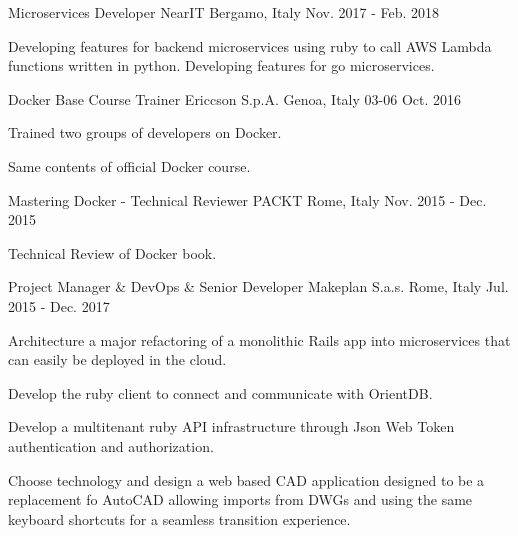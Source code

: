 \begin{cventries}
  \cventry
    {Microservices Developer} %
    {NearIT} %
    {Bergamo, Italy} %
    {Nov. 2017 - Feb. 2018} %
    {
      \begin{cvitems} %
        \item {Developing features for backend microservices using ruby to call AWS Lambda functions written in python. Developing features for go microservices.}
      \end{cvitems}
    }

  \cventry
    {Docker Base Course Trainer} %
    {Ericcson S.p.A.} %
    {Genoa, Italy} %
    {03-06 Oct. 2016} %
    {
      \begin{cvitems} %
        \item {Trained two groups of developers on Docker.}
        \item {Same contents of official Docker course.}
      \end{cvitems}
    }

  \cventry
    {Mastering Docker - Technical Reviewer} %
    {PACKT} %
    {Rome, Italy} %
    {Nov. 2015 - Dec. 2015} %
    {
      \begin{cvitems} %
        \item {Technical Review of Docker book.}
      \end{cvitems}
    }

  \cventry
    {Project Manager \& DevOps \& Senior Developer} %
    {Makeplan S.a.s.} %
    {Rome, Italy} %
    {Jul. 2015 - Dec. 2017} %
    {
      \begin{cvitems} %
        \item {Architecture a major refactoring of a monolithic Rails app into microservices that can easily be deployed in the cloud.}
        \item {Develop the ruby client to connect and communicate with OrientDB.}
        \item {Develop a multitenant ruby API infrastructure through Json Web Token authentication and authorization.}
        \item {Choose technology and design a web based CAD application designed to be a replacement fo AutoCAD allowing imports from DWGs and using the same keyboard shortcuts for a seamless transition experience.}
      \end{cvitems}
    }


\end{cventries}
